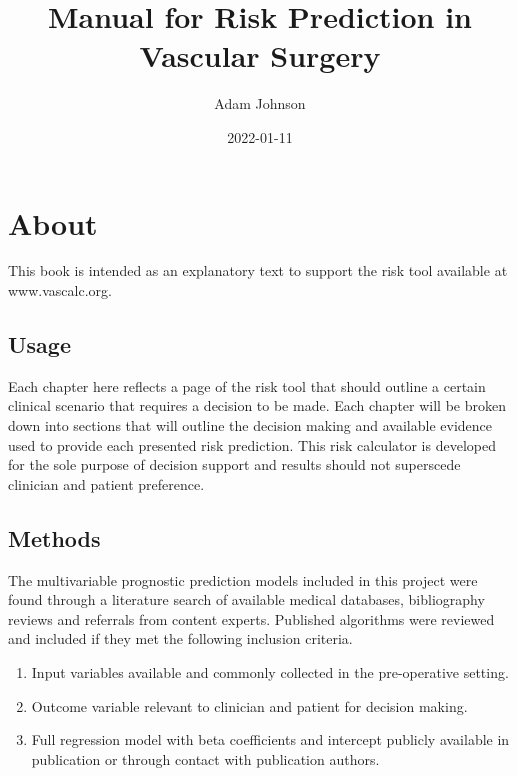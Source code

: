 \documentclass[
]{book}
\title{Manual for Risk Prediction in Vascular Surgery}
\author{Adam Johnson}
\date{2022-01-11}
\providecommand{\tightlist}{%
  \setlength{\itemsep}{0pt}\setlength{\parskip}{0pt}}
\begin{document}
\maketitle

{
\setcounter{tocdepth}{1}
\tableofcontents
}
\hypertarget{about}{%
\chapter{About}\label{about}}

This book is intended as an explanatory text to support the risk tool available at www.vascalc.org.

\hypertarget{usage}{%
\section{Usage}\label{usage}}

Each chapter here reflects a page of the risk tool that should outline a certain clinical scenario that requires a decision to be made. Each chapter will be broken down into sections that will outline the decision making and available evidence used to provide each presented risk prediction. This risk calculator is developed for the sole purpose of decision support and results should not superscede clinician and patient preference.

\hypertarget{methods}{%
\section{Methods}\label{methods}}

The multivariable prognostic prediction models included in this project were found through a literature search of available medical databases, bibliography reviews and referrals from content experts. Published algorithms were reviewed and included if they met the following inclusion criteria.

\begin{enumerate}
\def\labelenumi{\arabic{enumi}.}
\tightlist
\item
  Input variables available and commonly collected in the pre-operative setting.
\item
  Outcome variable relevant to clinician and patient for decision making.
\item
  Full regression model with beta coefficients and intercept publicly available in publication or through contact with publication authors.
\end{enumerate}
\end{document}
